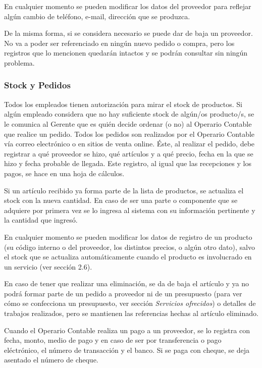 \documentclass[12pt]{extarticle}
\begin{document}
\begin{spacing}{1.2}
    En cualquier momento se pueden modificar los datos del proveedor para reflejar algún cambio de teléfono, e-mail, dirección que se produzca.

    De la misma forma, si se considera necesario se puede dar de baja un proveedor. No va a poder ser referenciado en ningún nuevo pedido o compra, pero los registros que lo mencionen quedarán intactos y se podrán consultar sin ningún problema.
    
    

    \subsubsection{Stock y Pedidos}

	Todos los empleados tienen autorización para mirar el stock de productos. Si algún empleado considera que no hay suficiente stock de algún/os producto/s, se le comunica al Gerente que es quién decide ordenar (o no) al Operario Contable que realice un pedido. Todos los pedidos son realizados por el Operario Contable vía correo electrónico o en sitios de venta online. Éste, al realizar el pedido, debe registrar a qué proveedor se hizo, qué artículos y a qué precio, fecha en la que se hizo y fecha probable de llegada. Este registro, al igual que las recepciones y los pagos, se hace en una hoja de cálculos.

    Si un artículo recibido ya forma parte de la lista de productos, se actualiza el stock con la nueva cantidad. En caso de ser una parte o componente que se adquiere por primera vez se lo ingresa al sistema con su información pertinente y la cantidad que ingresó. 
        
    En cualquier momento se pueden modificar los datos de registro de un producto (su código interno o del proveedor, los distintos precios, o algún otro dato), salvo el stock que se actualiza automáticamente cuando el producto es involucrado en un servicio (ver sección 2.6). 

    En caso de tener que realizar una eliminación, se da de baja el artículo y ya no podrá formar parte de un pedido a proveedor ni de un presupuesto (para ver cómo se confecciona un presupuesto, ver sección \textit{Servicios ofrecidos}) o detalles de trabajos realizados, pero se mantienen las referencias hechas al artículo eliminado.

    Cuando el Operario Contable realiza un pago a un proveedor, se lo registra con fecha, monto, medio de pago y en caso de ser por transferencia o pago eléctrónico, el número de transacción y el banco. Si se paga con cheque, se deja asentado el número de cheque.


\end{spacing}
\end{document}
